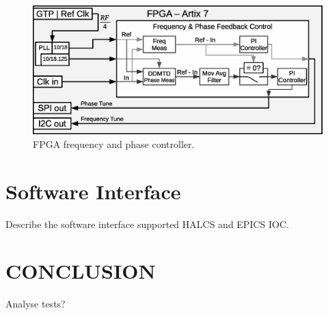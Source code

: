 \documentclass[a4paper,
               biblatex,      %
               ]{jacow}
\begin{document}
\begin{figure}[!htb]
   \centering
   \includegraphics*[width=0.8\columnwidth]{AFCFPGADMTD}
   \caption{FPGA frequency and phase controller.}
   \label{fig:AFCFPGADMTD}
\end{figure}

\section{Software Interface}
Describe the software interface supported HALCS and EPICS IOC.

\section{CONCLUSION}

Analyse tests?

\printbibliography
\newpage
\end{document}
